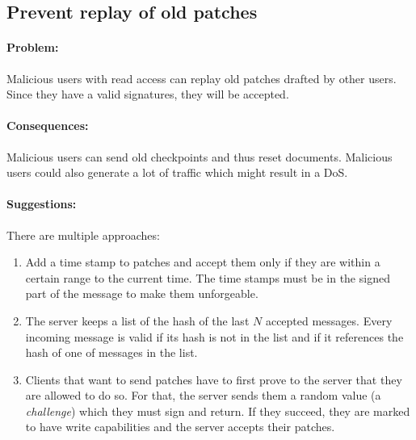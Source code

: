 \subsection{Prevent replay of old patches}

\paragraph{Problem:}
Malicious users with read access can replay old patches drafted by other users.
Since they have a valid signatures, they will be accepted.

\paragraph{Consequences:}
Malicious users can send old checkpoints and thus reset documents.
Malicious users could also generate a lot of traffic which might result in a \ac{DoS}.

\paragraph{Suggestions:}
There are multiple approaches:
\begin{enumerate}
  \item Add a time stamp to patches and accept them only if they are within a certain range to the current time.
    The time stamps must be in the signed part of the message to make them unforgeable.
  \item The server keeps a list of the hash of the last $N$ accepted messages.
    Every incoming message is valid if its hash is not in the list and if it references the hash of one of messages in the list.
  \item Clients that want to send patches have to first prove to the server that they are allowed to do so.
    For that, the server sends them a random value (a \textit{challenge}) which they must sign and return.
    If they succeed, they are marked to have write capabilities and the server accepts their patches.
\end{enumerate}

